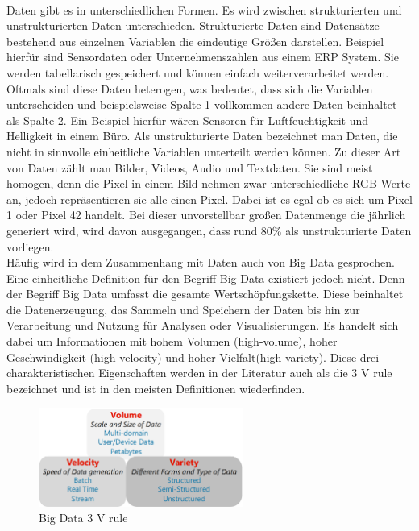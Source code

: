 \begin{onehalfspace}
        \\
        Daten gibt es in unterschiedlichen Formen. Es wird zwischen strukturierten und unstrukturierten Daten unterschieden. Strukturierte Daten sind Datensätze bestehend aus einzelnen Variablen die eindeutige Größen darstellen. Beispiel hierfür sind Sensordaten oder Unternehmenszahlen aus einem ERP System. Sie werden tabellarisch gespeichert und können einfach weiterverarbeitet werden. Oftmals sind diese Daten heterogen, was bedeutet, dass sich die Variablen unterscheiden und beispielsweise Spalte 1 vollkommen andere Daten beinhaltet als Spalte 2. Ein Beispiel hierfür wären Sensoren für Luftfeuchtigkeit und Helligkeit in einem Büro. Als unstrukturierte Daten bezeichnet man Daten, die nicht in sinnvolle einheitliche Variablen unterteilt werden können. Zu dieser Art von Daten zählt man Bilder, Videos, Audio und Textdaten. Sie sind meist homogen, denn die Pixel in einem Bild nehmen zwar unterschiedliche RGB Werte an, jedoch repräsentieren sie alle einen Pixel. Dabei ist es egal ob es sich um Pixel 1 oder Pixel 42 handelt.\cite{Horn2022} Bei dieser unvorstellbar großen Datenmenge die jährlich generiert wird, wird davon ausgegangen, dass rund 80\% als unstrukturierte Daten vorliegen.\cite{Otto2019}
        \\
        Häufig wird in dem Zusammenhang mit Daten auch von Big Data gesprochen. Eine einheitliche Definition für den Begriff Big Data existiert jedoch nicht. Denn der Begriff Big Data umfasst die gesamte Wertschöpfungskette. Diese beinhaltet die Datenerzeugung, das Sammeln und Speichern der Daten bis hin zur Verarbeitung und Nutzung für Analysen oder Visualisierungen.\cite{Taleb2018}\cite{Faroukhi2020} Es handelt sich dabei um Informationen mit hohem Volumen (high-volume), hoher Geschwindigkeit (high-velocity) und hoher Vielfalt(high-variety). Diese drei charakteristischen Eigenschaften werden in der Literatur auch als die \glqq{}3 V rule\grqq{} bezeichnet und ist in den meisten Definitionen wiederfinden.\cite{Taleb2018}\cite{Yalaoui2021} 
        \begin{figure}[h]
            \centering
            \includegraphics[width = 6.7cm]{Bilder/3VRule.png}
            \caption{Big Data 3 V rule \cite{Taleb2018}}

\end{figure}
\end{onehalfspace}
